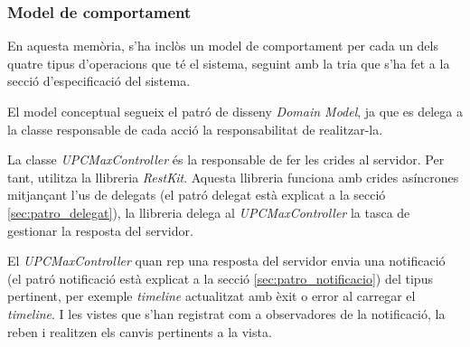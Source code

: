 
\subsubsection{Model de comportament}

En aquesta memòria, s'ha inclòs un model de comportament per cada un dels quatre tipus d'operacions que té el sistema, seguint amb la tria que s'ha fet a la secció d'especificació del sistema. 

El model conceptual segueix el patró de disseny \textit{Domain Model}, ja que es delega a la classe responsable de cada acció la responsabilitat de realitzar-la. 

La classe \textit{UPCMaxController} és la responsable de fer les crides al servidor. Per tant, utilitza la llibreria \textit{RestKit}. Aquesta llibreria funciona amb crides asíncrones mitjançant l'us de delegats (el patró delegat està explicat a la secció \ref{sec:patro_delegat}), la llibreria delega al \textit{UPCMaxController} la tasca de gestionar la resposta del servidor.

El \textit{UPCMaxController} quan rep una resposta del servidor envia una notificació (el patró notificació està explicat a la secció \ref{sec:patro_notificacio}) del tipus pertinent, per exemple \textit{timeline} actualitzat amb èxit o error al carregar el \textit{timeline}. I les vistes que s'han registrat com a observadores de la notificació, la reben i realitzen els canvis pertinents a la vista.



